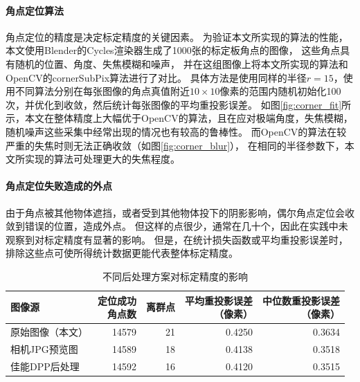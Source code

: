 \paragraph{角点定位算法}
角点定位的精度是决定标定精度的关键因素。
为验证本文所实现的算法的性能，本文使用Blender的Cycles渲染器生成了1000张的标定板角点的图像，
这些角点具有随机的位置、角度、失焦模糊和噪声，
并在这组图像上将本文所实现的算法和OpenCV的cornerSubPix算法进行了对比。
具体方法是使用同样的半径$r=15$，使用不同算法分别在每张图像的角点真值附近$10\times 10$像素的范围内随机初始化100次，并优化到收敛，然后统计每张图像的平均重投影误差。
如图\ref{fig:corner_fit}所示，本文在整体精度上大幅优于OpenCV的算法，且在应对极端角度，失焦模糊，随机噪声这些采集中经常出现的情况也有较高的鲁棒性。
而OpenCV的算法在较严重的失焦时则无法正确收敛（如图\ref{fig:corner_blur}），
在相同的半径参数下，本文所实现的算法可处理更大的失焦程度。

\paragraph{角点定位失败造成的外点}
由于角点被其他物体遮挡，或者受到其他物体投下的阴影影响，偶尔角点定位会收敛到错误的位置，造成外点。
但这样的点很少，通常在几十个，因此在实践中未观察到对标定精度有显著的影响。
但是，在统计损失函数或平均重投影误差时，排除这些点可使所得统计数据更能代表整体标定精度。

\begin{table}
    \centering
    \caption{不同后处理方案对标定精度的影响}
    \begin{tabular}{l|rrrr}
        \toprule
        图像源 & \shortstack{定位成功\\角点数} & 离群点 & \shortstack{平均重投影误差\\（像素）}& \shortstack{中位数重投影误差\\（像素）} \\
        \midrule
        原始图像（本文） & 14579 & 21 & 0.4250 & 0.3634 \\
        相机JPG预览图   & 14589 & 18 & 0.4138 & 0.3518 \\
        佳能DPP后处理   & 14592 & 16 & 0.4120 & 0.3515 \\
        \bottomrule
    \end{tabular}
    \label{tab:camera_postprocess}
\end{table}

